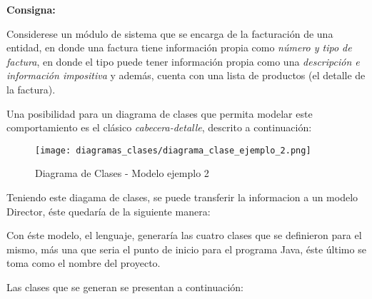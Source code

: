 \textbf{Consigna:}
\begin{displayquote}
	Considerese un módulo de sistema que se encarga de la facturación de
	una entidad, en donde una factura tiene información propia como \textit{número
	y tipo de factura}, en donde el tipo puede tener información propia como una
	\textit{descripción e información impositiva} y además, cuenta con una lista
	de productos (el detalle de la factura).
\end{displayquote}

Una posibilidad para un diagrama de clases que permita modelar este
comportamiento es el clásico \textit{cabecera-detalle}, descrito a
continuación:

\begin{figure}[H]
	\centering
	\texttt{[image: diagramas\_clases/diagrama\_clase\_ejemplo\_2.png]}
	\caption{Diagrama de Clases - Modelo ejemplo 2}
	\label{fig:dc_mod_ej_2}
\end{figure}

Teniendo este diagama de clases, se puede transferir la informacion a un modelo
Director, éste quedaría de la siguiente manera:



Con éste modelo, el lenguaje, generaría las cuatro clases que se definieron
para el mismo, más una que seria el punto de inicio para el programa Java, éste
último se toma como el nombre del proyecto.

Las clases que se generan se presentan a continuación:









